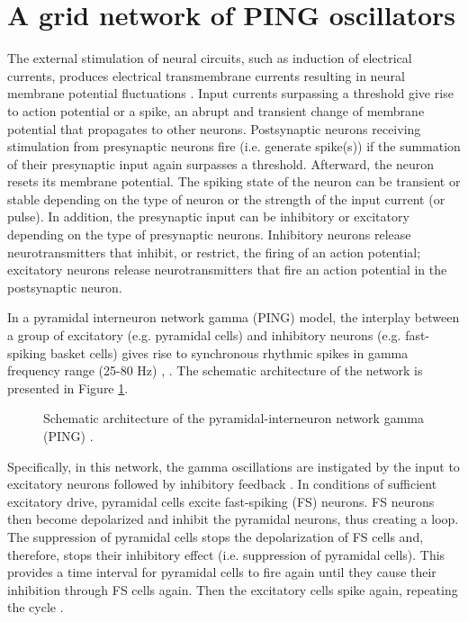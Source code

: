 \section{A grid network of PING oscillators}

The external stimulation of neural circuits, such as induction of electrical currents, produces electrical transmembrane currents resulting in neural membrane potential fluctuations \cite{IzhikevichBook2004:2}. Input currents surpassing a threshold give rise to action potential or a spike, an abrupt and transient change of membrane potential that propagates to other neurons. Postsynaptic neurons receiving stimulation from presynaptic neurons fire (i.e. generate spike(s)) if the summation of their presynaptic input again surpasses a threshold. Afterward, the neuron resets its membrane potential. The spiking state of the neuron can be transient or stable depending on the type of neuron or the strength of the input current (or pulse). In addition, the presynaptic input can be inhibitory or excitatory depending on the type of presynaptic neurons. Inhibitory neurons release neurotransmitters that inhibit, or restrict, the firing of an action potential; excitatory neurons release neurotransmitters that fire an action potential in the postsynaptic neuron.

In a pyramidal interneuron network gamma (PING) model, the interplay between a group of  excitatory (e.g. pyramidal cells) and inhibitory neurons (e.g. fast-spiking basket cells) gives rise to synchronous rhythmic spikes in gamma frequency range (25-80 Hz)  \cite{Whittington2000}, \cite{Borgers2003}. The schematic architecture of the network is presented in Figure \ref{fig:single-ping}.

\begin{figure}[!htp]
    \centering
    
    \caption{Schematic architecture of the pyramidal-interneuron network gamma (PING) \cite{Lowet2015}.}
    \label{fig:single-ping}
\end{figure}

Specifically, in this network, the gamma oscillations are instigated by the input to excitatory neurons followed by inhibitory feedback \cite{Whittington2000}. In conditions of sufficient excitatory drive, pyramidal cells excite fast-spiking (FS) neurons. FS neurons then become depolarized and inhibit the pyramidal neurons, thus creating a loop. The suppression of pyramidal cells stops the depolarization of FS cells and, therefore, stops their inhibitory effect (i.e. suppression of pyramidal cells). This provides a time interval for pyramidal cells to fire again until they cause their inhibition through FS cells again. Then the excitatory cells spike again, repeating the cycle \cite{Kopell2011}.

